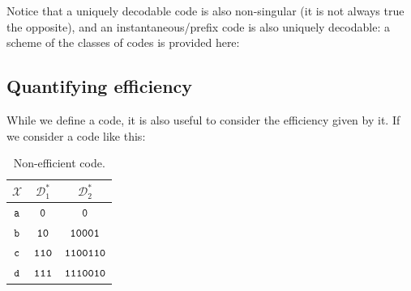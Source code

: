 \begin{enumerate}
\end{enumerate}

Notice that a uniquely decodable code is also non-singular (it is not always true the opposite), and an instantaneous/prefix code is also uniquely decodable: a scheme of the classes of codes is provided here:


\subsection{Quantifying efficiency}
While we define a code, it is also useful to consider the efficiency given by it. If we consider a code like this:
\begin{table}[H]
	\center
\begin{tabular}{| c | c | c |}
	\hline
	$\mathcal{X}$ & $\mathcal{D}^*_1$ & $\mathcal{D}^*_2$\\\hline
	$\verb|a|$ & $\verb|0|$ & $\verb|0|$ \\
	$\verb|b|$ & $\verb|10|$ & $\verb|10001|$ \\
	$\verb|c|$ & $\verb|110|$ & $\verb|1100110|$ \\
	$\verb|d|$ & $\verb|111|$ & $\verb|1110010|$ \\
	\hline
\end{tabular}
\caption{Non-efficient code.}
\end{table}


